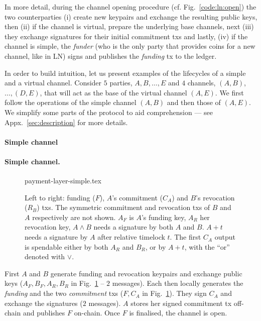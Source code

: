   In more detail, during the channel opening procedure (cf.
  Fig.~\ref{code:ln:open}) the two counterparties (i) create new keypairs and
  exchange the resulting public keys, then (ii) if the channel is
  virtual, prepare the underlying base channels, next (iii) they exchange
  signatures for their initial commitment txs
  and lastly, (iv) if the channel is simple, the \emph{funder} (who is the only
  party that provides coins for a new channel, like in LN) signs and publishes
  the \emph{funding} tx to the ledger.

  In order to build intuition, let us present examples of the
  lifecycles of a simple and a virtual channel. Consider $5$ parties, $A, B,
  \dots, E$ and $4$ channels, $(A, B)$, $\dots,(D, E)$, that will act as
  the base of the virtual channel $(A, E)$. We first follow the operations of
  the simple channel $(A, B)$ and then those of $(A, E)$. We simplify some parts
  of the protocol to aid comprehension --- see Appx.~\ref{sec:description} for
  more details.

  \makeatletter%
    {\paragraph{Simple channel}}%
    {\paragraph{Simple channel.}}%
  \makeatother%
  \begin{figure}[!htbp]
    \centering
    {payment-layer-simple.tex}
    \caption{Left to right: funding ($F$), $A$'s commitment ($C_A$) and $B$'s
    revocation ($R_B$) txs.
    The symmetric commitment and
    revocation txs of $B$ and $A$ respectively are not shown.
    $A_F$ is $A$'s funding key, $A_R$ her revocation key, $A \wedge B$ needs
    a signature by both $A$ and $B$. $A+t$ needs a signature
    by $A$ after relative timelock $t$. The first $C_A$ output is
    spendable either by both $A_R$ and $B_R$, or by $A + t$, with the ``or'' denoted with $\vee$.}
    \label{figure:payment-layer-simple}
  \end{figure}

  First $A$ and $B$ generate funding and revocation keypairs and exchange
  public keys ($A_F, B_F, A_R, B_R$ in Fig.~\ref{figure:payment-layer-simple} --
  $2$ messages). Each then
  locally generates the \emph{funding} and the two \emph{commitment} txs
  ($F, C_A$ in Fig.~\ref{figure:payment-layer-simple}). They
  sign $C_A$ and exchange the
  signatures ($2$ messages). $A$ stores her
  signed commitment tx off-chain and publishes $F$ on-chain. Once $F$
  is finalised, the channel is open.

